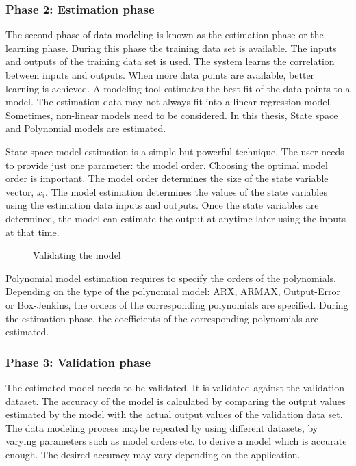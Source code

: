 \documentclass[article,type=msc,colorback,12pt,accentcolor=tud8b,table]{tudthesis}
\begin{document}
 	\subsubsection{Phase 2: Estimation phase}
 	
 	The second phase of data modeling is known as the estimation phase or the learning phase. During this phase the training data set is available. The inputs and outputs of the training data set is used. The system learns the correlation between inputs and outputs. When more data points are available, better learning is achieved. A modeling tool estimates the best fit of the data points to a model. The estimation data may not always fit into a linear regression model. Sometimes, non-linear models need to be considered. In this thesis, State space and Polynomial models are estimated.
 	
 	State space model estimation is a simple but powerful technique. The user needs to provide just one parameter: the model order. Choosing the optimal model order is important. The model order determines the size of the state variable vector, $x_i$. The model estimation determines the values of the state variables using the estimation data inputs and outputs. Once the state variables are determined, the model can estimate the output at anytime later using the inputs at that time.

\begin{figure}[H]
	\begin{center}
		\makebox[\textwidth]{\texttt{[image: C8]}}
	\end{center}
	\caption{Validating the model}
	\label{fig:data_modeling_flowchart}
\end{figure}

Polynomial model estimation requires to specify the orders of the polynomials. Depending on the type of the polynomial model: ARX, ARMAX, Output-Error or Box-Jenkins,  the orders of the corresponding polynomials are specified. During the estimation phase, the coefficients of the corresponding polynomials are estimated.
  
\subsubsection{Phase 3: Validation phase}

The estimated model needs to be validated. It is validated against the validation dataset. The accuracy of the model is calculated by comparing the output values estimated by the model with the actual output values of the validation data set. The data modeling process maybe repeated by using different datasets, by varying parameters such as model orders etc. to derive a model which is accurate enough. The desired accuracy may vary depending on the application.
\end{document}
